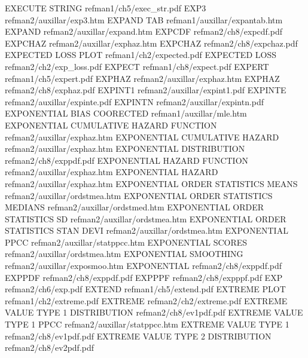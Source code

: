 EXECUTE STRING                          refman1/ch5/exec_str.pdf
EXP3                                    refman2/auxillar/exp3.htm
EXPAND TAB                              refman1/auxillar/expantab.htm
EXPAND                                  refman2/auxillar/expand.htm
EXPCDF                                  refman2/ch8/expcdf.pdf
EXPCHAZ                                 refman2/auxillar/exphaz.htm
EXPCHAZ                                 refman2/ch8/expchaz.pdf
EXPECTED LOSS PLOT                      refman1/ch2/expected.pdf
EXPECTED LOSS                           refman2/ch2/exp_loss.pdf
EXPECT                                  refman1/ch8/expect.pdf
EXPERT                                  refman1/ch5/expert.pdf
EXPHAZ                                  refman2/auxillar/exphaz.htm
EXPHAZ                                  refman2/ch8/exphaz.pdf
EXPINT1                                 refman2/auxillar/expint1.pdf
EXPINTE                                 refman2/auxillar/expinte.pdf
EXPINTN                                 refman2/auxillar/expintn.pdf
EXPONENTIAL BIAS COORECTED              refman1/auxillar/mle.htm
EXPONENTIAL CUMULATIVE HAZARD FUNCTION  refman2/auxillar/exphaz.htm
EXPONENTIAL CUMULATIVE HAZARD           refman2/auxillar/exphaz.htm
EXPONENTIAL DISTRIBUTION                refman2/ch8/exppdf.pdf
EXPONENTIAL HAZARD FUNCTION             refman2/auxillar/exphaz.htm
EXPONENTIAL HAZARD                      refman2/auxillar/exphaz.htm
EXPONENTIAL ORDER STATISTICS MEANS      refman2/auxillar/ordstmea.htm
EXPONENTIAL ORDER STATISTICS MEDIANS    refman2/auxillar/ordstmed.htm
EXPONENTIAL ORDER STATISTICS SD         refman2/auxillar/ordstmea.htm
EXPONENTIAL ORDER STATISTICS STAN DEVI  refman2/auxillar/ordstmea.htm
EXPONENTIAL PPCC                        refman2/auxillar/statppcc.htm
EXPONENTIAL SCORES                      refman2/auxillar/ordstmea.htm
EXPONENTIAL SMOOTHING                   refman2/auxillar/exposmoo.htm
EXPONENTIAL                             refman2/ch8/exppdf.pdf
EXPPDF                                  refman2/ch8/exppdf.pdf
EXPPPF                                  refman2/ch8/expppf.pdf
EXP                                     refman2/ch6/exp.pdf
EXTEND                                  refman1/ch5/extend.pdf
EXTREME PLOT                            refman1/ch2/extreme.pdf
EXTREME                                 refman2/ch2/extreme.pdf
EXTREME VALUE TYPE 1 DISTRIBUTION       refman2/ch8/ev1pdf.pdf
EXTREME VALUE TYPE 1 PPCC               refman2/auxillar/statppcc.htm
EXTREME VALUE TYPE 1                    refman2/ch8/ev1pdf.pdf
EXTREME VALUE TYPE 2 DISTRIBUTION       refman2/ch8/ev2pdf.pdf
